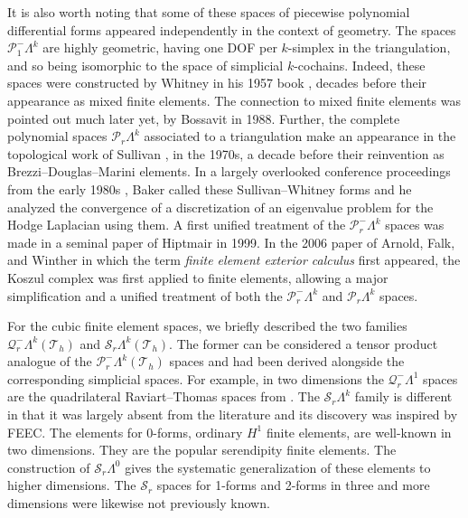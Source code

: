 {It is also worth noting that some of these spaces of piecewise polynomial differential forms appeared independently in the context of geometry. The spaces $\mathcal P_1^-\Lambda^k$ are highly geometric, having one DOF per $k$-simplex in the triangulation, and so being isomorphic to the space of simplicial $k$-cochains. Indeed, these spaces were constructed by Whitney in his 1957 book , decades before their appearance as mixed finite elements. The connection to mixed finite elements was pointed out much later yet, by Bossavit  in 1988. Further, the complete polynomial spaces $\mathcal P_r\Lambda^k$ associated to a triangulation make an appearance in the topological work of Sullivan ,  in the 1970s, a decade before their reinvention as Brezzi–Douglas–Marini elements. In a largely overlooked conference proceedings from the early 1980s , Baker called these Sullivan–Whitney forms and he analyzed the convergence of a discretization of an eigenvalue problem for the Hodge Laplacian using them. A first unified treatment of the $\mathcal P_r^-\Lambda^k$ spaces was made in a seminal paper of Hiptmair  in 1999. In the 2006 paper of Arnold, Falk, and Winther  in which the term \emph{finite element exterior calculus} first appeared, the Koszul complex was first applied to finite elements, allowing a major simplification and a unified treatment of both the $\mathcal P_r^-\Lambda^k$ and $\mathcal P_r\Lambda^k$ spaces.}

{For the cubic finite element spaces, we briefly described the two families $\mathcal Q_r^-\Lambda^k(\mathcal T_h)$ and $\mathcal S_r\Lambda^k(\mathcal T_h)$. The former can be considered a tensor product analogue of the $\mathcal P_r^-\Lambda^k(\mathcal T_h)$ spaces and had been derived alongside the corresponding simplicial spaces. For example, in two dimensions the $\mathcal Q_r^-\Lambda^1$ spaces are the quadrilateral Raviart–Thomas spaces from . The $\mathcal S_r\Lambda^k$ family is different in that it was largely absent from the literature and its discovery was inspired by FEEC. The elements for 0-forms, ordinary $H^1$ finite elements, are well-known in two dimensions. They are the popular serendipity finite elements. The construction of $\mathcal S_r\Lambda^0$ gives the systematic generalization of these elements to higher dimensions. The $\mathcal S_r$ spaces for 1-forms and 2-forms in three and more dimensions were likewise not previously known.}

